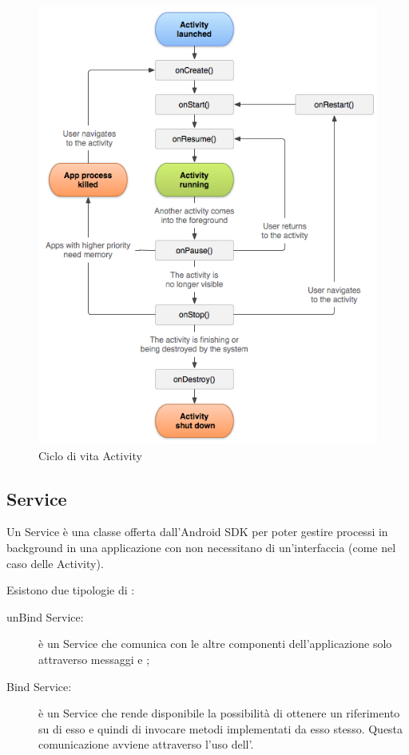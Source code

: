 \documentclass[../ManualeSviluppatore.tex]{subfiles}
\begin{document}
\begin{appendices}
				\begin{figure} [h]
					\centering
					\includegraphics[scale=0.5]{img/ActivityCiclo}
					\caption{Ciclo di vita Activity}
					\label{fig:ActivityCiclo}
				\end{figure}
			
		\subsection{Service}
			Un Service è una classe offerta dall'Android SDK per poter gestire processi in background in una applicazione con non necessitano di un'interfaccia (come nel caso delle Activity).
		
		Esistono due tipologie di \Service:
			\begin{description}
				\item [unBind Service:] è un Service che comunica con le altre componenti dell'applicazione solo attraverso messaggi \Intent e \BroadcastReceiver;
				\item [Bind Service:] è un Service che rende disponibile la possibilità di ottenere un riferimento su di esso e quindi di invocare metodi implementati da esso stesso. Questa comunicazione avviene attraverso l'uso dell'\IBinder.
			\end{description}
		

\end{appendices}
\end{document}
